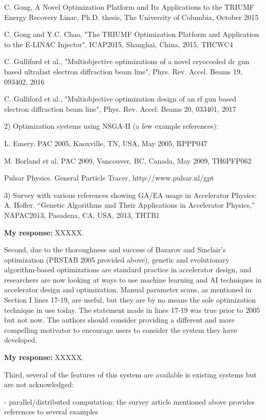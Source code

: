 \documentclass{article}
\begin{document}
C. Gong, A Novel Optimization Platform and Its Applications to the
TRIUMF Energy Recovery Linac, Ph.D. thesis, The University of
Columbia, October 2015

C. Gong and Y.C. Chao, "The TRIUMF Optimization Platform and
Application to the E-LINAC Injector", ICAP2015, Shanghai, China, 2015,
THCWC4

C. Gulliford et al., "Multiobjective optimizations of a novel
cryocooled dc gun based ultrafast electron diffraction beam line",
Phys. Rev. Accel. Beams 19, 093402, 2016

C. Gulliford et al., "Multiobjective optimization design of an rf gun
based electron diffraction beam line", Phys. Rev. Accel. Beams 20,
033401, 2017

2) Optimization systems using NSGA-II (a few example references):

L. Emery. PAC 2005, Knoxville, TN, USA, May 2005, RPPP047

M. Borland et al. PAC 2009, Vancouver, BC, Canada, May 2009, TH6PFP062

Pulsar Physics. General Particle Tracer, http://www.pulsar.nl/gpt

3) Survey with various references showing GA/EA usage in Accelerator
Physics: A. Hofler. “Genetic Algorithms and Their Applications in
Accelerator Physics,” NAPAC2013, Pasadena, CA, USA, 2013, THTB1

{\bf My response:} {\color{blue} XXXXX.}





Second, due to the thoroughness and success of Bazarov and Sinclair’s
optimization (PRSTAB 2005 provided above), genetic and evolutionary
algorithm-based optimizations are standard practice in accelerator
design, and researchers are now looking at ways to use machine
learning and AI techniques in accelerator design and optimization.
Manual parameter scans, as mentioned in Section I lines 17-19, are
useful, but they are by no means the sole optimization technique in
use today. The statement made in lines 17-19 was true prior to 2005
but not now. The authors should consider providing a different and
more compelling motivator to encourage users to consider the system
they have developed.

{\bf My response:} {\color{blue} XXXXX.}

Third, several of the features of this system are available is
existing systems but are not acknowledged:

- parallel/distributed computation: the survey article mentioned above
provides references to several examples
\end{document}
